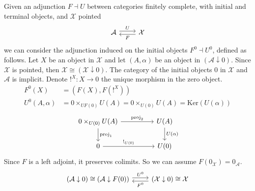 Given an adjunction $F \dashv U$ between categories finitely complete, with initial and terminal objects, and $\mathcal{X}$ pointed
\[
\begin{tikzcd}
\mathcal{A} \arrow[r, "U", shift left] & \mathcal{X} \arrow[l, "F", shift left]
\end{tikzcd}
\]
we can consider the adjunction induced on the initial objects $F^0 \dashv U^0$, defined as follows. Let $X$ be an object in $\mathcal{X}$ and let $(A,\alpha)$ be an object in $(\mathcal{A}\downarrow 0)$. Since $\mathcal{X}$ is pointed, then $\mathcal{X} \cong (\mathcal{X}\downarrow 0)$. The category of the initial objects $0$ in $\mathcal{X}$ and $\mathcal{A}$ is implicit. Denote $!^X:X \to 0$ the unique morphism in the zero object.
\begin{align*}
F^0(X) &= (F(X), F(!^X)) \\[1.5ex]
U^0(A,\alpha) &= 0\times_{UF(0)}U(A) = 0\times_{U(0)}U(A) = \mathrm{Ker}(U(\alpha))
\end{align*}
\[
\begin{tikzcd}
0\times_{U(0)}U(A) \arrow[rr, "\mathrm{proj}_2"] \arrow[d, "\mathrm{proj}_1"] &  & U(A) \arrow[d, "U(\alpha)"] \\
0 \arrow[rr, "!_{U(0)}"]                                                      &  & U(0)                       
\end{tikzcd}
\]
Since $F$ is a left adjoint, it preserves colimits. So we can assume $F(0_\mathcal{X})=0_\mathcal{A}$.
\begin{equation}\label{induced ajunction on 0}
\begin{tikzcd}
(\mathcal{A} \downarrow 0) \cong (\mathcal{A} \downarrow F(0)) \arrow[r, "U^0", shift left] & (\mathcal{X} \downarrow 0) \cong \mathcal{X} \arrow[l, "F^0", shift left]
\end{tikzcd}
\end{equation}
